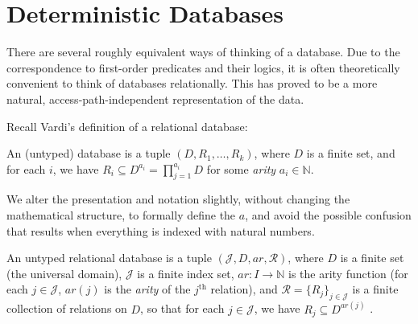 \documentclass{article}
\theoremstyle{plain}
\theoremstyle{definition}
\theoremstyle{remark}
\newcommand{\Idx}{\mathcal J}
\newcommand{\arity}{\mathit{ar}}
\begin{document}

\section{Deterministic Databases}

There are several roughly equivalent ways of thinking of a database. Due to the correspondence to first-order predicates and their logics, it is often theoretically convenient to think of databases relationally. This has proved \cite{Codd} to be a more natural, access-path-independent representation of the data.   

Recall Vardi's \cite{vardi} definition of a relational database:
\begin{leftbar}	
\begin{defn*}
    An (untyped) database is a tuple $(D, R_1, \ldots, R_k)$, where $D$ is a finite set, and for each $i$, we have $R_i \subseteq D^{a_i} = \prod_{j =1}^{a_i} D$ 
    for some \emph{arity} $a_i \in \mathbb N$. 
\end{defn*}
\end{leftbar}

We alter the presentation and notation slightly, without changing the mathematical structure, to formally define the $a$, and avoid the possible confusion that results when everything is indexed with natural numbers. 

\begin{defn}
    An untyped relational database is a tuple $(\Idx, D, \arity, \mathcal R)$, where $D$ is a
    finite set (the universal domain), $\Idx$ is a finite index set, $\arity: I \to
    \mathbb N$ is the arity function (for each $j \in \Idx$, $\arity(j)$ is the
    \emph{arity} of the $j^{\text{th}}$ relation), and $\mathcal R = \{R_j\}_{j
    \in \Idx}$ is a finite collection of relations on $D$, so that for each $j \in
    \Idx$, we have $R_j \subseteq D^{\arity(j)} $%
    .
\end{defn}
\end{document}
